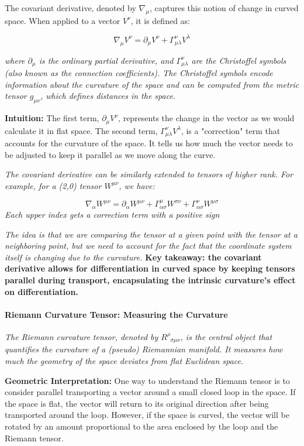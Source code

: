 The covariant derivative, denoted by \(\nabla_{\mu}\), captures this notion of change in curved space. When applied to a vector \(V^\nu\), it is defined as:

\[
\nabla_{\mu} V^\nu = \partial_{\mu} V^\nu + \Gamma^\nu_{\mu\lambda} V^\lambda
\]

\textit{where \(\partial_{\mu}\) is the ordinary partial derivative, and \(\Gamma^\nu_{\mu\lambda}\) are the Christoffel symbols (also known as the connection coefficients). The Christoffel symbols encode information about the curvature of the space and can be computed from the metric tensor \(g_{\mu\nu}\), which defines distances in the space.}

\textbf{Intuition:} The first term, \(\partial_{\mu} V^\nu\), represents the change in the vector as we would calculate it in flat space. The second term, \(\Gamma^\nu_{\mu\lambda} V^\lambda\), is a "correction" term that accounts for the curvature of the space. It tells us how much the vector needs to be adjusted to keep it parallel as we move along the curve.

\textit{The covariant derivative can be similarly extended to tensors of higher rank. For example, for a (2,0) tensor \(W^{\mu\nu}\), we have:}

\[
\nabla_\alpha W^{\mu\nu} = \partial_\alpha W^{\mu\nu} + \Gamma^\mu_{\alpha\sigma} W^{\sigma\nu} + \Gamma^\nu_{\alpha\sigma} W^{\mu\sigma}
\]
\textit{Each upper index gets a correction term with a positive sign}

\textit{The idea is that we are comparing the tensor at a given point with the tensor at a neighboring point, but we need to account for the fact that the coordinate system itself is changing due to the curvature.}
\textbf{Key takeaway: the covariant derivative allows for differentiation in curved space by keeping tensors parallel during transport, encapsulating the intrinsic curvature's effect on differentiation.}

\paragraph{Riemann Curvature Tensor: Measuring the Curvature}

\textit{The Riemann curvature tensor, denoted by \(R^\rho_{\;\;\sigma\mu\nu}\), is the central object that quantifies the curvature of a (pseudo) Riemannian manifold. It measures how much the geometry of the space deviates from flat Euclidean space.}

\textbf{Geometric Interpretation:} One way to understand the Riemann tensor is to consider parallel transporting a vector around a small closed loop in the space. If the space is flat, the vector will return to its original direction after being transported around the loop. However, if the space is curved, the vector will be rotated by an amount proportional to the area enclosed by the loop and the Riemann tensor.

